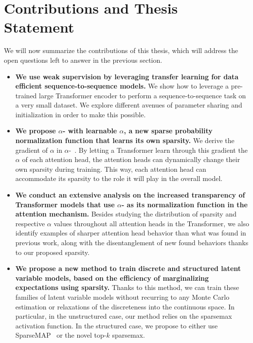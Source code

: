 \section{Contributions and Thesis Statement}
\label{sec:int_contributions}

We will now summarize the contributions of this thesis, which will
address the open questions left to answer in the previous section.

\begin{itemize}

      \item \textbf{We use weak supervision by leveraging transfer learning
                  for data efficient sequence-to-sequence models.}
            We show how to leverage a pre-trained large Transformer
            encoder to perform a sequence-to-sequence task on a very
            small dataset. We explore different avenues of parameter
            sharing and initialization in order to make this
            possible.


      \item \textbf{We propose {\boldmath $\alpha$}-\entmaxtext{} with
                  learnable {\boldmath $\alpha$}, a new sparse probability
                  normalization function that learns its own sparsity.}
            We derive the gradient of $\alpha$ in
            $\alpha$-\entmaxtext{}~\citep{entmax}. By letting a
            Transformer learn through this gradient the $\alpha$ of
            each attention head, the attention heads can dynamically
            change their own sparsity during training. This way, each
            attention head can accommodate its sparsity to the role
            it will play in the overall model.

      \item \textbf{We conduct an extensive analysis on the increased
                  transparency of Transformer models that use {\boldmath
                              $\alpha$}-\entmaxtext{} as its normalization function in the
                  attention mechanism.}
            Besides studying the distribution of sparsity and respective $\alpha$ values
            throughout all attention heads in the Transformer, we also identify
            examples of sharper attention head behavior than what was found in
            previous work, along with the disentanglement of new found behaviors
            thanks to our proposed sparsity.

      \item \textbf{We propose a new method to train discrete and
                  structured latent variable models, based on the
                  efficiency of marginalizing expectations using
                  sparsity.}
            Thanks to this method, we can train these families of
            latent variable models without recurring to any Monte Carlo
            estimation or relaxations of the discreteness into the
            continuous space. In particular, in the unstructured
            case, our method relies on the sparsemax activation
            function. In the structured case, we propose to either
            use SparseMAP~\citep{niculae2018sparsemap} or the
            novel top-$k$ sparsemax.


\end{itemize}
